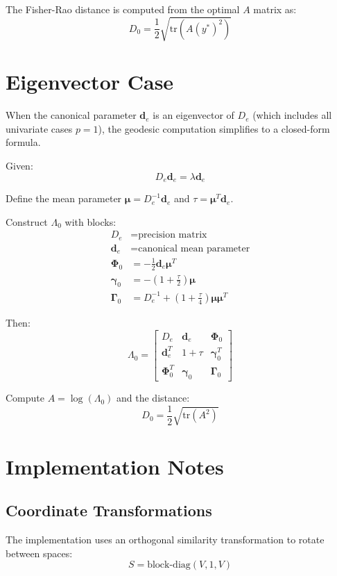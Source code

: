 \documentclass{article}
\begin{document}
The Fisher-Rao distance is computed from the optimal $A$ matrix as:
\[
D_0 = \frac{1}{2}\sqrt{\text{tr}(A(y^*)^2)}
\]

\section{Eigenvector Case}

When the canonical parameter $\mathbf{d}_e$ is an eigenvector of $D_e$ (which includes all univariate cases $p=1$), the geodesic computation simplifies to a closed-form formula.

Given:
\[
D_e \mathbf{d}_e = \lambda \mathbf{d}_e
\]

Define the mean parameter $\boldsymbol{\mu} = D_e^{-1} \mathbf{d}_e$ and $\tau = \boldsymbol{\mu}^T \mathbf{d}_e$.

Construct $\Lambda_0$ with blocks:
\begin{align}
D_e &= \text{precision matrix} \\
\mathbf{d}_e &= \text{canonical mean parameter} \\
\boldsymbol{\Phi}_0 &= -\frac{1}{2}\mathbf{d}_e \boldsymbol{\mu}^T \\
\boldsymbol{\gamma}_0 &= -\left(1 + \frac{\tau}{2}\right) \boldsymbol{\mu} \\
\boldsymbol{\Gamma}_0 &= D_e^{-1} + \left(1 + \frac{\tau}{4}\right) \boldsymbol{\mu} \boldsymbol{\mu}^T
\end{align}

Then:
\[
\Lambda_0 = \begin{bmatrix}
D_e & \mathbf{d}_e & \boldsymbol{\Phi}_0 \\
\mathbf{d}_e^T & 1 + \tau & \boldsymbol{\gamma}_0^T \\
\boldsymbol{\Phi}_0^T & \boldsymbol{\gamma}_0 & \boldsymbol{\Gamma}_0
\end{bmatrix}
\]

Compute $A = \log(\Lambda_0)$ and the distance:
\[
D_0 = \frac{1}{2}\sqrt{\text{tr}(A^2)}
\]

\section{Implementation Notes}

\subsection{Coordinate Transformations}

The implementation uses an orthogonal similarity transformation to rotate between spaces:
\[
S = \text{block-diag}(V, 1, V)
\]
\end{document}
